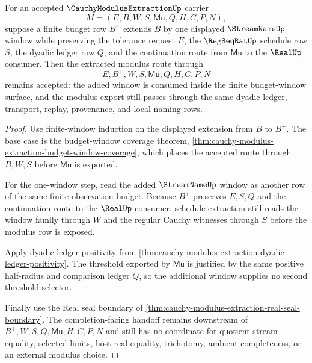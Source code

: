 \begin{theorem}
\label{thm:cauchy-modulus-extraction-window-induction}
For an accepted $\CauchyModulusExtractionUp$ carrier
$$
M=(E,B,W,S,\mathsf{Mu},Q,H,C,P,N),
$$
suppose a finite budget row $B^{+}$ extends $B$ by one displayed $\StreamNameUp$ window while preserving the tolerance request $E$, the $\RegSeqRatUp$ schedule row $S$, the dyadic ledger row $Q$, and the continuation route from $\mathsf{Mu}$ to the $\RealUp$ consumer. Then the extracted modulus route through
$$
E,B^{+},W,S,\mathsf{Mu},Q,H,C,P,N
$$
remains accepted: the added window is consumed inside the finite budget-window surface, and the modulus export still passes through the same dyadic ledger, transport, replay, provenance, and local naming rows.
\end{theorem}
\begin{proof}
Use finite-window induction on the displayed extension from $B$ to $B^{+}$. The base case is the budget-window coverage theorem, \autoref{thm:cauchy-modulus-extraction-budget-window-coverage}, which places the accepted route through $B,W,S$ before $\mathsf{Mu}$ is exported.

For the one-window step, read the added $\StreamNameUp$ window as another row of the same finite observation budget. Because $B^{+}$ preserves $E,S,Q$ and the continuation route to the $\RealUp$ consumer, schedule extraction still reads the window family through $W$ and the regular Cauchy witnesses through $S$ before the modulus row is exposed.

Apply dyadic ledger positivity from \autoref{thm:cauchy-modulus-extraction-dyadic-ledger-positivity}. The threshold exported by $\mathsf{Mu}$ is justified by the same positive half-radius and comparison ledger $Q$, so the additional window supplies no second threshold selector.

Finally use the Real seal boundary of \autoref{thm:cauchy-modulus-extraction-real-seal-boundary}. The completion-facing handoff remains downstream of $B^{+},W,S,Q,\mathsf{Mu},H,C,P,N$ and still has no coordinate for quotient stream equality, selected limits, host real equality, trichotomy, ambient completeness, or an external modulus choice.
\end{proof}

